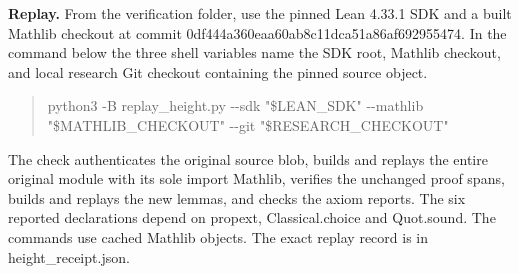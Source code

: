 \documentclass[11pt,letterpaper]{article}
\begin{document}
\textbf{Replay.} From the verification folder, use the pinned Lean 4.33.1 SDK and a built Mathlib checkout at commit {\ttfamily\small 0df444a360eaa6\allowbreak{}0ab8c11dca51a8\allowbreak{}6af692955474}. In the command below the three shell variables name the SDK root, Mathlib checkout, and local research Git checkout containing the pinned source object.

\begin{quote}\raggedright\setlength{\parskip}{1pt}
{\ttfamily\small python3 -\allowbreak{}B replay\_\allowbreak{}height.\allowbreak{}py -\allowbreak{}-\allowbreak{}sdk "\$LEAN\_\allowbreak{}SDK" -\allowbreak{}-\allowbreak{}mathlib "\$MATHLIB\_\allowbreak{}CHECKOUT" -\allowbreak{}-\allowbreak{}git "\$RESEARCH\_\allowbreak{}CHECKOUT"}\par
\end{quote}
The check authenticates the original source blob, builds and replays the entire original module with its sole import {\ttfamily\small Mathlib}, verifies the unchanged proof spans, builds and replays the new lemmas, and checks the axiom reports. The six reported declarations depend on {\ttfamily\small propext}, {\ttfamily\small Classical.\allowbreak{}choice} and {\ttfamily\small Quot.\allowbreak{}sound}. The commands use cached Mathlib objects. The exact replay record is in {\ttfamily\small height\_\allowbreak{}receipt.\allowbreak{}json}.
\end{document}
